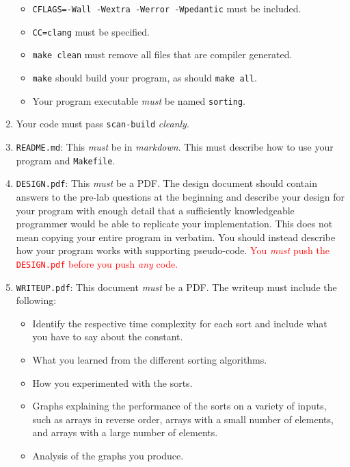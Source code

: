 \documentclass[11pt]{article}
\begin{document}
\begin{enumerate}
    \begin{itemize}
      \item \texttt{CFLAGS=-Wall -Wextra -Werror -Wpedantic}
        must be included.
      \item \texttt{CC=clang} must be specified.
      \item \texttt{make clean} must remove all files that are compiler
        generated.
      \item \texttt{make} should build your program, as should
        \texttt{make all}.
      \item Your program executable \emph{must} be named
        \texttt{sorting}.
    \end{itemize}

  \item Your code must pass \texttt{scan-build} \emph{cleanly}.

  \item \texttt{README.md}: This \emph{must} be in \emph{markdown}.
    This must describe how to use your program and \texttt{Makefile}.

  \item \texttt{DESIGN.pdf}: This \emph{must} be a PDF. The design
    document should contain answers to the pre-lab questions at the
    beginning and describe your design for your program with enough
    detail that a sufficiently knowledgeable programmer would be able to
    replicate your implementation.  This does not mean copying your
    entire program in verbatim. You should instead describe how your
    program works with supporting pseudo-code.  \textcolor{red}{You
      \emph{must} push the \texttt{DESIGN.pdf} before you push
    \emph{any} code.}

  \item \texttt{WRITEUP.pdf}: This document \emph{must} be a PDF. The
    writeup must include the following:
    \begin{itemize}
      \item Identify the respective time complexity for each sort and
        include what you have to say about the constant.
      \item What you learned from the different sorting algorithms.
      \item How you experimented with the sorts.
      \item Graphs explaining the performance of the sorts on a variety
        of inputs, such as arrays in reverse order, arrays with a small
        number of elements, and arrays with a large number of elements.
      \item Analysis of the graphs you produce.
    \end{itemize}
\end{enumerate}
\end{document}
